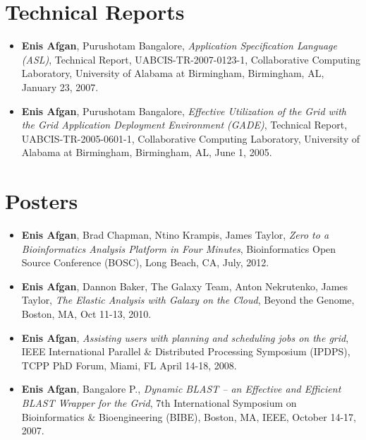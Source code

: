 \documentclass{article}
\begin{document}
%
%

\vspace{\parskip}
\section{Technical Reports}
\begin {itemize}
    \item \textbf{Enis Afgan}, Purushotam Bangalore, \textit{Application Specification Language (ASL)}, Technical Report, UABCIS-TR-2007-0123-1, Collaborative Computing Laboratory, University of Alabama at Birmingham, Birmingham, AL, January 23, 2007.
    \item \textbf{Enis Afgan}, Purushotam Bangalore,   \textit{Effective Utilization of the Grid with the Grid Application Deployment Environment (GADE)}, Technical Report, UABCIS-TR-2005-0601-1, Collaborative Computing Laboratory, University of Alabama at Birmingham, Birmingham, AL, June 1, 2005. 
   
   \end{itemize} 
    
    
%
%

\vspace{\parskip}
\section{Posters}
\begin {itemize}
    \item \textbf{Enis Afgan}, Brad Chapman, Ntino Krampis, James Taylor, \textit{Zero to a Bioinformatics Analysis Platform in Four Minutes}, Bioinformatics Open Source Conference (BOSC), Long Beach, CA, July, 2012.
    \item \textbf{Enis Afgan}, Dannon Baker, The Galaxy Team, Anton Nekrutenko, James Taylor,  \textit{The Elastic Analysis with Galaxy on the Cloud}, Beyond the Genome, Boston, MA, Oct 11-13, 2010.
    \item \textbf{Enis Afgan}, \textit{Assisting users with planning and scheduling jobs on the grid}, IEEE International Parallel \& Distributed Processing Symposium (IPDPS), TCPP PhD Forum, Miami, FL April 14-18, 2008.
    \item \textbf{Enis Afgan}, Bangalore P., \textit{Dynamic BLAST – an Effective and Efficient BLAST Wrapper for the Grid}, 7th International Symposium on Bioinformatics \& Bioengineering (BIBE), Boston, MA, IEEE, October 14-17, 2007.
   
   \end{itemize} 
    
\end{document}

